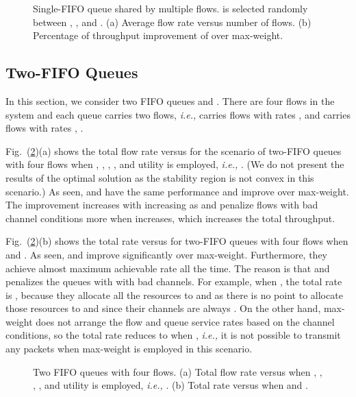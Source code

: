 \documentclass[conference]{IEEEtran}
\newcommand{\ie}{{\em i.e., }}
\begin{document}
\begin{figure}
\centering
{} \hspace{-20pt}
\vspace{-10pt}
\caption{Single-FIFO queue shared by multiple flows.  is selected randomly between , , and . (a) Average flow rate versus number of flows. (b) Percentage of throughput improvement of  over max-weight. }
\label{fig:sim_2}
\vspace{-5pt}
\end{figure}

\subsection{Two-FIFO Queues}
In this section, we consider two FIFO queues  and . There are four flows in the system and each queue carries two flows, \ie  carries flows with rates ,  and  carries flows with rates , . 

Fig.~(\ref{fig:sim_3})(a) shows the total flow rate versus  for the scenario of two-FIFO queues with four flows when , , , , and  utility is employed, \ie . (We do not present the results of the optimal solution as the stability region  is not convex in this scenario.) As seen,  and  have the same performance and improve over max-weight. The improvement increases with increasing  as  and  penalize flows with bad channel conditions more when  increases, which increases the total throughput.   

Fig.~(\ref{fig:sim_3})(b) shows the total rate versus  for two-FIFO queues with four flows when  and . As seen,  and  improve significantly over max-weight. Furthermore, they achieve almost maximum achievable rate  all the time. The reason is that  and  penalizes the queues with with bad channels. For example, when , the total rate is , because they allocate all the resources to  and  as there is no point to allocate those resources to  and  since their channels are always . On the other hand, max-weight does not arrange the flow and queue service rates based on the channel conditions, so the total rate reduces to  when , \ie it is not possible to transmit any packets when max-weight is employed in this scenario.



\begin{figure}
\centering
{}
\vspace{-10pt}
\caption{Two FIFO queues with four flows. (a) Total flow rate versus  when , , , , and  utility is employed, \ie . (b) Total rate versus  when  and . }
\label{fig:sim_3}
\vspace{-5pt}
\end{figure}
\end{document}
